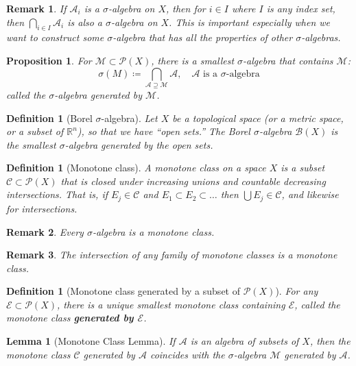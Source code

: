 \documentclass[11pt, letter]{book}
\newtheorem{lemma}[theorem]{Lemma}
\newtheorem{definition}[theorem]{Definition}
\newtheorem{proposition}[theorem]{Proposition}
\newtheorem{remark}{Remark}
\begin{document}
\begin{remark}
If $\mathcal{A}_i$ is a $\sigma$-algebra on $X$, then for $i \in I$ where $I$ is any index set, then $\bigcap_{i\in I} \mathcal{A}_i$ is also a $\sigma$-algebra on $X$. This is important especially when we want to construct some $\sigma$-algebra that has all the properties of other $\sigma$-algebras.
\end{remark}
\begin{proposition}
For $\mathcal{M} \subset \mathcal{P}(X)$, there is a smallest $\sigma$-algebra that contains $\mathcal{M}$:
\begin{equation*}
    \sigma(M) \coloneqq  \bigcap_{\mathcal{A}\supseteq \mathcal{M}} \mathcal{A}, \quad \mathcal{A} \text{ is a $\sigma$-algebra}
\end{equation*}
called the $\sigma$-algebra generated by $\mathcal{M}$. 
\end{proposition}
\begin{definition}[Borel $\sigma$-algebra]
Let $X$ be a topological space (or a metric space, or a subset of $\mathbb{R}^n$), so that we have ``open sets.'' The Borel $\sigma$-algebra $\mathcal{B}(X)$ is the smallest $\sigma$-algebra generated by the open sets.
\end{definition}


\begin{definition}[Monotone class]
A monotone class on a space $X$ is a subset $\mathcal{C}\subset \mathcal{P}(X)$ that is closed under increasing unions and countable decreasing intersections. That is, if $E_j \in \mathcal{C}$ and $E_1 \subset E_2 \subset \dots$ then $\bigcup E_j \in \mathcal{C}$, and likewise for intersections.
\end{definition}
\begin{remark}
Every $\sigma$-algebra is a monotone class.
\end{remark}
\begin{remark}
The intersection of any family of monotone classes is a monotone class.
\end{remark}
\begin{definition}[Monotone class generated by a subset of $\mathcal{P}(X)$]
For any $\mathcal{E} \subset \mathcal{P}(X)$, there is a unique smallest monotone class containing $\mathcal{E}$, called the monotone class \textbf{generated by $\mathcal{E}$}. 
\end{definition}
\begin{lemma}[Monotone Class Lemma]
If $\mathcal{A}$ is an algebra of subsets of $X$, then the monotone class $\mathcal{C}$ generated by $\mathcal{A}$ coincides with the $\sigma$-algebra $\mathcal{M}$ generated by $\mathcal{A}$. 
\end{lemma}
\end{document}
